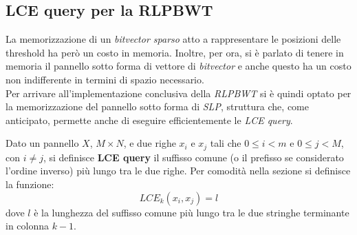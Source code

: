 \subsection{LCE query per la RLPBWT}
La memorizzazione di un \textit{bitvector sparso} atto a rappresentare le
posizioni delle threshold ha però un costo in memoria. Inoltre, per ora, si è
parlato di tenere in memoria il pannello sotto forma di vettore di
\textit{bitvector} e anche questo ha un costo non indifferente in termini di
spazio necessario.\\
Per arrivare all'implementazione conclusiva della \textit{RLPBWT} si è quindi
optato per la memorizzazione del pannello sotto forma di \textit{SLP}, struttura
che, come anticipato, permette anche di eseguire efficientemente le \textit{LCE
  query}.
\begin{definizione}
  Dato un pannello $X$, $M\times N$, e due righe $x_i$ e $x_j$ tali che $0\leq
  i <m$ e $0\leq j <M$, con $i\neq j$, si definisce \textbf{LCE query} il
  suffisso comune (o il prefisso se considerato l'ordine inverso) più lungo tra
  le due righe. Per comodità nella sezione si 
  definisce la funzione: 
  \[LCE_k(x_i,x_j)=l\]
  dove $l$ è la lunghezza del suffisso comune più lungo tra le due stringhe
  terminante in colonna $k-1$.
\end{definizione}
